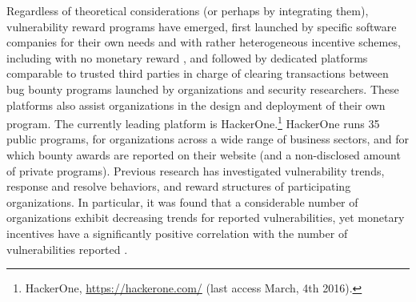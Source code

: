 Regardless of theoretical considerations (or perhaps by integrating them), vulnerability reward programs have emerged, first launched by specific software companies for their own needs and with rather heterogeneous incentive schemes\cite{finifter2013empirical}, including with no monetary reward \cite{zhao2014exploratory}, and followed by dedicated platforms comparable to trusted third parties in charge of clearing transactions between bug bounty programs launched by organizations and security researchers. These platforms also assist organizations in the design and deployment of their own program. The currently leading platform is HackerOne.\footnote{HackerOne, \url{https://hackerone.com/} (last access March, 4th 2016).} HackerOne runs 35 public programs, for organizations across a wide range of business sectors, and for which bounty awards are reported on their website (and a non-disclosed amount of private programs). Previous research has investigated vulnerability trends, response and resolve behaviors, and reward structures of participating organizations. In particular, it was found that a considerable number of organizations exhibit decreasing trends for reported vulnerabilities, yet monetary incentives have a significantly positive correlation with the number of vulnerabilities reported \cite{zhao2015empirical}.